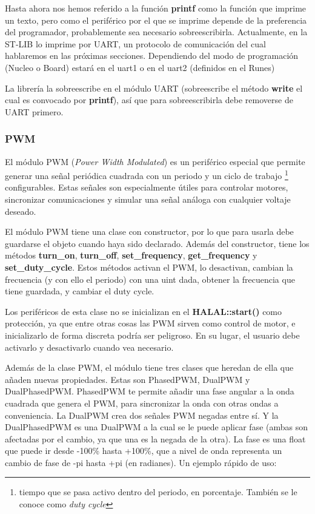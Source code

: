 \documentclass{report}
\begin{document}
Hasta ahora nos hemos referido a la función \textbf{printf} como la función que imprime un texto, pero como el periférico por el que se imprime depende de la preferencia del programador, probablemente sea necesario sobreescribirla. Actualmente, en la ST-LIB lo imprime por UART, un protocolo de comunicación del cual hablaremos en las próximas secciones. Dependiendo del modo de programación (Nucleo o Board) estará en el uart1 o en el uart2 (definidos en el Runes) \par
La librería la sobreescribe en el módulo UART (sobreescribe el método \textbf{write} el cual es convocado por \textbf{printf}), así que para sobreescribirla debe removerse de UART primero.

\subsubsection{PWM}
El módulo PWM (\textit{Power Width Modulated}) es un periférico especial que permite generar una señal periódica cuadrada con un periodo y un ciclo de trabajo \footnote{tiempo que se pasa activo dentro del periodo, en porcentaje. También se le conoce como \textit{duty cycle}} configurables. Estas señales son especialmente útiles para controlar motores, sincronizar comunicaciones y simular una señal análoga con cualquier voltaje deseado. 
\par \vspace{0.3cm}
El módulo PWM tiene una clase con constructor, por lo que para usarla debe guardarse el objeto cuando haya sido declarado. Además del constructor, tiene los métodos \textbf{turn\_on}, \textbf{turn\_off}, \textbf{set\_frequency}, \textbf{get\_frequency} y \textbf{set\_duty\_cycle}. Estos métodos activan el PWM, lo desactivan, cambian la frecuencia (y con ello el periodo) con una uint dada, obtener la frecuencia que tiene guardada, y cambiar el duty cycle. \par
Los periféricos de esta clase no se inicializan en el \textbf{HALAL::start()} como protección, ya que entre otras cosas las PWM sirven como control de motor, e inicializarlo de forma discreta podría ser peligroso. En su lugar, el usuario debe activarlo y desactivarlo cuando vea necesario. 
\par \vspace{0.3cm}
Además de la clase PWM, el módulo tiene tres clases que heredan de ella que añaden nuevas propiedades. Estas son PhasedPWM, DualPWM y DualPhasedPWM. PhasedPWM te permite añadir una fase angular a la onda cuadrada que genera el PWM, para sincronizar la onda con otras ondas a conveniencia. La DualPWM crea dos señales PWM negadas entre sí. Y la DualPhasedPWM es una DualPWM a la cual se le puede aplicar fase (ambas son afectadas por el cambio, ya que una es la negada de la otra). La fase es una float que puede ir desde -100\% hasta +100\%, que a nivel de onda representa un cambio de fase de -pi hasta +pi (en radianes). Un ejemplo rápido de uso:
\end{document}
